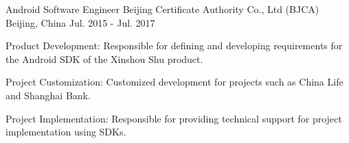 \begin{cventries}
  \cventry
    {Android Software Engineer} %
    {Beijing Certificate Authority Co., Ltd (BJCA)} %
    {Beijing, China} %
    {Jul. 2015 - Jul. 2017} %
    {
      \begin{cvitems} %
        \item {Product Development: Responsible for defining and developing requirements for the Android SDK of the Xinshou Shu product.}
        \item {Project Customization: Customized development for projects such as China Life and Shanghai Bank.}
        \item {Project Implementation: Responsible for providing technical support for project implementation using SDKs.}
      \end{cvitems}
    }

\end{cventries}
